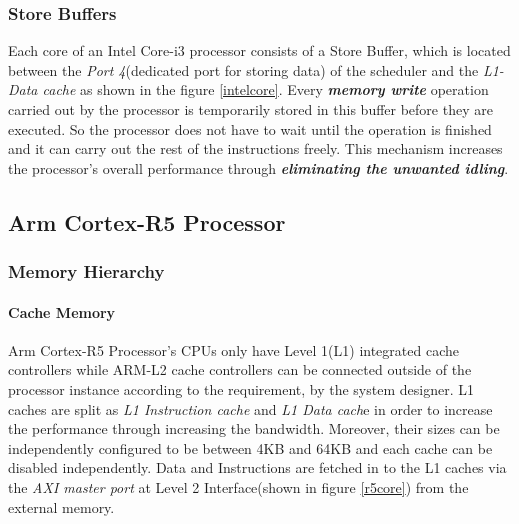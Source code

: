 \documentclass[a4paper,11pt]{article}
\begin{document}
\subsubsection{Store Buffers}

Each core of an Intel Core-i3 processor consists of a Store Buffer, which is located between the \textit{Port 4}(dedicated port for storing data) of the scheduler and the \textit{L1-Data cache} as shown in the figure \ref{intelcore}. Every \textbf{\textit{memory write}} operation carried out by the processor is temporarily stored in this buffer before they are executed. So the processor does not have to wait until the operation is finished and it can carry out the rest of the instructions freely. This mechanism increases the processor's overall performance through \textit{\textbf{eliminating the unwanted idling}}.



\subsection{Arm Cortex-R5 Processor}

\subsubsection{Memory Hierarchy}

\paragraph{Cache Memory} Arm Cortex-R5 Processor's CPUs only have Level 1(L1) integrated cache controllers while ARM-L2 cache controllers can be connected outside of the processor instance according to the requirement, by the system designer. L1 caches are split as \textit{L1 Instruction cache} and \textit{L1 Data cach}e in order to increase the performance through increasing the bandwidth. Moreover, their sizes can be independently configured to be between 4KB and 64KB and each cache can be disabled independently. Data and Instructions are fetched in to the L1 caches via the \textit{AXI master port} at Level 2 Interface(shown in figure \ref{r5core}) from the external memory.\\
\end{document}
